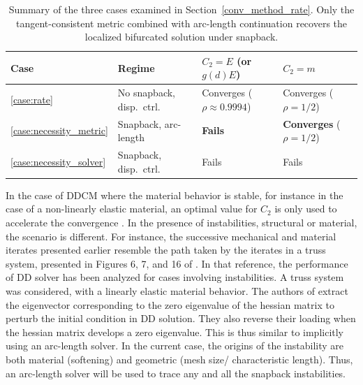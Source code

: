 \documentclass[10pt,review]{cas-sc}
\begin{document}
\begin{table}[h]
	\centering
	\caption{Summary of the three cases examined in Section~\ref{conv_method_rate}. Only the tangent-consistent metric combined with arc-length continuation recovers the localized bifurcated solution under snapback.}
	\label{tab:necessity_summary}
	\begin{tabular}{llll}
		\hline
		Case & Regime & $C_2 = E$ (or $g(d) E$) & $C_2 = m$ \\
		\hline
		\ref{case:rate} & No snapback, disp.\ ctrl.\ & Converges ($\rho \approx 0.9994$) & Converges ($\rho = 1/2$) \\
		\ref{case:necessity_metric} & Snapback, arc-length & \textbf{Fails}  & \textbf{Converges} ($\rho = 1/2$) \\
		\ref{case:necessity_solver} & Snapback, disp.\ ctrl.\ & Fails & Fails \\
		\hline
	\end{tabular}
\end{table}



In the case of DDCM where the material behavior is stable, for instance in the case of a non-linearly elastic material, an optimal value for $C_2$ is only used to accelerate the convergence \cite{Nguyen2022}. In the presence of instabilities, structural or material, the scenario is different. For instance, the successive mechanical and material iterates presented earlier resemble the path taken by the iterates in a truss system, presented in Figures 6, 7, and 16 of \cite{Kuang2023}. In that reference, the performance of DD solver has been analyzed for cases involving instabilities. A truss system was considered, with a linearly elastic material behavior. The authors of \cite{Kuang2023} extract the eigenvector corresponding to the zero eigenvalue of the hessian matrix to perturb the initial condition in DD solution. They also reverse their loading when the hessian matrix develops a zero eigenvalue. This is thus similar to implicitly using an arc-length solver. In the current case, the origins of the instability are both material (softening) and geometric (mesh size/ characteristic length). Thus, an arc-length solver will be used to trace any and all the  snapback instabilities.

\end{document}
